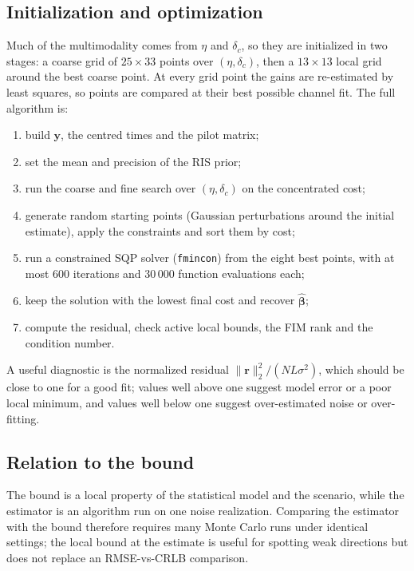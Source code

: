 \documentclass[11pt,a4paper]{article}
\newcommand{\vect}[1]{\bm{#1}}
\begin{document}
\subsection{Initialization and optimization}
Much of the multimodality comes from $\eta$ and $\delta_c$, so they are initialized in two stages: a coarse grid
of $25\times33$ points over $(\eta,\delta_c)$, then a $13\times13$ local grid around the best coarse point. At
every grid point the gains are re-estimated by least squares, so points are compared at their best possible
channel fit. The full algorithm is:
\begin{enumerate}
\item build $\vect{y}$, the centred times and the pilot matrix;
\item set the mean and precision of the RIS prior;
\item run the coarse and fine search over $(\eta,\delta_c)$ on the concentrated cost;
\item generate random starting points (Gaussian perturbations around the initial estimate), apply the
constraints and sort them by cost;
\item run a constrained SQP solver (\texttt{fmincon}) from the eight best points, with at most 600 iterations
and 30\,000 function evaluations each;
\item keep the solution with the lowest final cost and recover $\hat{\vect{\beta}}$;
\item compute the residual, check active local bounds, the FIM rank and the condition number.
\end{enumerate}
A useful diagnostic is the normalized residual $\|\vect{r}\|_2^2/(NL\sigma^2)$, which should be close to one for
a good fit; values well above one suggest model error or a poor local minimum, and values well below one suggest
over-estimated noise or over-fitting.

\subsection{Relation to the bound}
The bound is a local property of the statistical model and the scenario, while the estimator is an algorithm run on
one noise realization. Comparing the estimator with the bound therefore requires many Monte Carlo runs under
identical settings; the local bound at the estimate is useful for spotting weak directions but does not replace
an RMSE-vs-CRLB comparison.

\end{document}

